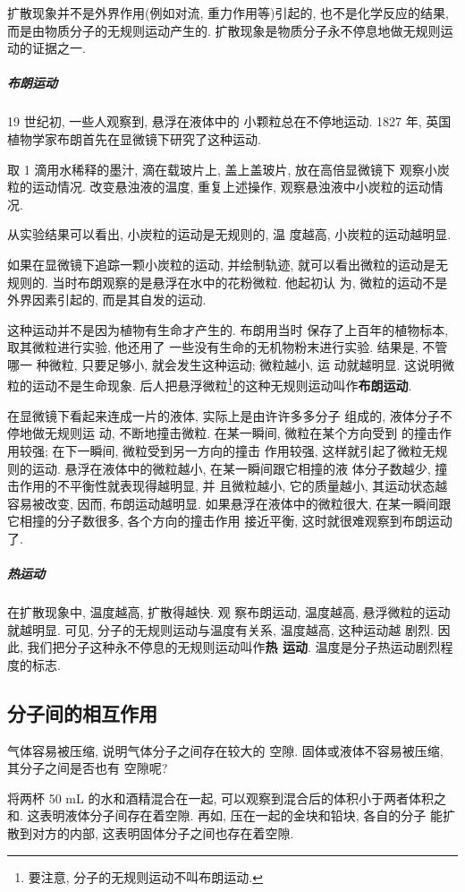 \documentclass[11pt,a4paper]{ctexbook}
\begin{document}
扩散现象并不是外界作用(例如对流, 重力作用等)引起的,
也不是化学反应的结果, 而是由物质分子的无规则运动产生的.
扩散现象是物质分子永不停息地做无规则运动的证据之一.

\subparagraph{布朗运动} 19 世纪初, 一些人观察到, 悬浮在液体中的
小颗粒总在不停地运动. 1827 年, 英国植物学家布朗首先在显微镜下研究了这种运动.

{\kaishu 取 1 滴用水稀释的墨汁, 滴在载玻片上, 盖上盖玻片, 放在高倍显微镜下
观察小炭粒的运动情况. 改变悬浊液的温度, 重复上述操作, 观察悬浊液中小炭粒的运动情况.}

从实验结果可以看出, 小炭粒的运动是无规则的, 温
度越高, 小炭粒的运动越明显.

如果在显微镜下追踪一颗小炭粒的运动, 并绘制轨迹,
就可以看出微粒的运动是无规则的.
当时布朗观察的是悬浮在水中的花粉微粒. 他起初认
为, 微粒的运动不是外界因素引起的, 而是其自发的运动.

这种运动并不是因为植物有生命才产生的. 布朗用当时
保存了上百年的植物标本, 取其微粒进行实验, 他还用了
一些没有生命的无机物粉末进行实验. 结果是, 不管哪一
种微粒, 只要足够小, 就会发生这种运动; 微粒越小, 运
动就越明显. 这说明微粒的运动不是生命现象.
后人把悬浮微粒\footnote{要注意, 分子的无规则运动不叫布朗运动.}的这种无规则运动叫作\textbf{布朗运动}.

在显微镜下看起来连成一片的液体, 实际上是由许许多多分子
组成的, 液体分子不停地做无规则运
动, 不断地撞击微粒. 在某一瞬间, 微粒在某个方向受到
的撞击作用较强; 在下一瞬间, 微粒受到另一方向的撞击
作用较强, 这样就引起了微粒无规则的运动.
悬浮在液体中的微粒越小, 在某一瞬间跟它相撞的液
体分子数越少, 撞击作用的不平衡性就表现得越明显, 并
且微粒越小, 它的质量越小, 其运动状态越容易被改变,
因而, 布朗运动越明显. 如果悬浮在液体中的微粒很大,
在某一瞬间跟它相撞的分子数很多, 各个方向的撞击作用
接近平衡, 这时就很难观察到布朗运动了.

\subparagraph{热运动} 在扩散现象中, 温度越高, 扩散得越快. 观
察布朗运动, 温度越高, 悬浮微粒的运动就越明显. 可见,
分子的无规则运动与温度有关系, 温度越高, 这种运动越
剧烈. 因此, 我们把分子这种永不停息的无规则运动叫作\textbf{热
运动}. 温度是分子热运动剧烈程度的标志.

\subsection*{分子间的相互作用}

气体容易被压缩, 说明气体分子之间存在较大的
空隙. 固体或液体不容易被压缩, 其分子之间是否也有
空隙呢?

将两杯 50 mL 的水和酒精混合在一起, 可以观察到混合后的体积小于两者体积之和.
这表明液体分子间存在着空隙. 再如, 压在一起的金块和铅块, 各自的分子
能扩散到对方的内部, 这表明固体分子之间也存在着空隙.
\end{document}
